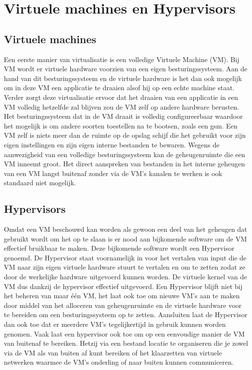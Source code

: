 \section{Virtuele machines en Hypervisors}

\subsection{Virtuele machines}
Een eerste manier van virtualisatie is een volledige Virtuele Machine (VM). Bij VM wordt er virtuele hardware voorzien van een eigen besturingssysteem. Aan de hand van dit besturingssysteem en de virtuele hardware is het dan ook mogelijk om in deze VM een applicatie te draaien alsof hij op een echte machine staat. Verder zorgt deze virtualisatie ervoor dat het draaien van een applicatie in een VM volledig hetzelfde zal blijven zou de VM zelf op andere hardware berusten. Het besturingssysteem dat in de VM draait is volledig configureerbaar waardoor het mogelijk is om andere soorten toestellen na te bootsen, zoals een gsm. Een VM zelf is niets meer dan de ruimte op de opslag schijf die het gebruikt voor zijn eigen instellingen en zijn eigen interne bestanden te bewaren. Wegens de aanwezigheid van een volledige besturingssysteem kan de geheugenruimte die een VM inneemt groot. Het direct aanspreken van bestanden in het interne geheugen van een VM langst buitenaf zonder via de VM’s kanalen te werken is ook standaard niet mogelijk\autocite{Eder2016}.

\subsection{Hypervisors}

Omdat een VM beschouwd kan worden als gewoon een deel van het geheugen dat gebruikt wordt om het op te slaan is er nood aan bijkomende software om de VM effectief bruikbaar te maken. Deze bijkomende software wordt een Hypervisor genoemd. De Hypervisor staat voornamelijk in voor het vertalen van input die de VM naar zijn eigen virtuele hardware stuurt te vertalen en om te zetten zodat ze door de werkelijke hardware uitgevoerd kunnen worden. De virtuele kernel van de VM dus dankzij de hypervisor effectief uitgevoerd. Een Hypervisor blijft niet bij het beheren van maar één VM, het laat ook toe om nieuwe VM’s aan te maken door middel van het alloceren van geheugenruimte en de virtuele hardware voor te bereiden om een besturingssysteem op te zetten. Aansluiten laat de Hypervisor dan ook toe dat er meerdere VM’s tegelijkertijd in gebruik kunnen worden genomen.  Vaak laat een hypervisor ook toe om op een eenvoudige manier de VM van buitenaf te bereiken. Hetzij via een bestand locatie te organiseren die je zowel via de VM als van buiten af kunt bereiken of het klaarzetten van virtuele netwerken waarmee de VM’s onderling of naar buiten kunnen communiceren.

